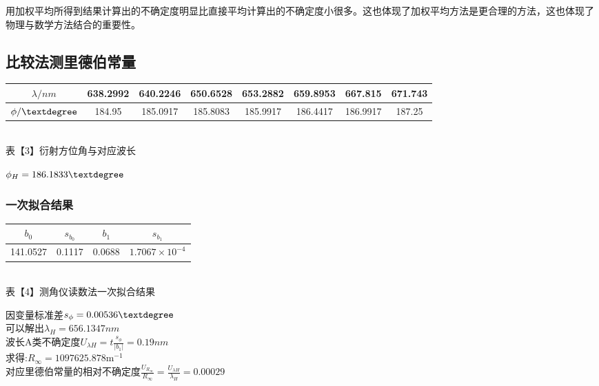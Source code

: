 \documentclass[8pt,a4paper,nocap]{ctexart}
\begin{document}
	用加权平均所得到结果计算出的不确定度明显比直接平均计算出的不确定度小很多。这也体现了加权平均方法是更合理的方法，这也体现了物理与数学方法结合的重要性。
	\subsection{比较法测里德伯常量}
	\begin{center}
		\begin{tabular}{|c|c|c|c|c|c|c|c|}\hline
			\(\lambda/nm\) & 638.2992 & 640.2246 & 650.6528 & 653.2882 & 659.8953 &	667.815	& 671.743	 	\\ \hline
			\(\phi/\textdegree\) & 184.95  & 185.0917   & 185.8083 & 185.9917  & 186.4417 & 186.9917 & 187.25  \\ \hline
	\end{tabular}\\
	{\footnotesize 表【3】衍射方位角与对应波长}
	\end{center}
	\( \phi_H = 186.1833\textdegree \)
	\subsubsection{一次拟合结果}
\begin{center}
		\begin{tabular}{|c|c|c|c|}\hline
		\(b_0\)& \(s_{b_0}\) & \(b_1\) & \(s_{b_1}\) \\ \hline
		 141.0527 & 0.1117 & 0.0688  & \(1.7067\times10^{-4}\) \\ \hline
	\end{tabular}\\
	{\footnotesize 表【4】测角仪读数法一次拟合结果}
\end{center}
	 因变量标准差\(s_\phi =0.00536\textdegree\)\\
	 可以解出\(\lambda_H = 656.1347nm\)\\
	 波长A类不确定度\(\displaystyle U_{\lambda H} = t\frac{s_\phi}{|b_1|} = 0.19 nm\)\\
	 求得:\(R_\infty = 1097625.878 \mathrm{m}^{-1}\)\\
	 对应里德伯常量的相对不确定度\(\displaystyle \frac{U_{R_\infty}}{R_\infty} = \frac{U_{\lambda H}}{\lambda_H} =  0.00029\)
\end{document}
